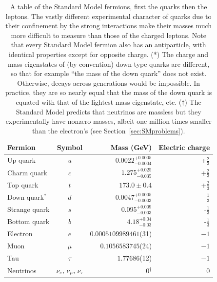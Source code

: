   \renewcommand{\arraystretch}{1.2}
  \begin{table}
    \centering
    \begin{tabular}{l c r r}
      Fermion             & Symbol & Mass (GeV) \cite{pdg} & Electric charge \\
      \hline
      Up quark            & $u$    & $0.0022^{+0.0005}_{-0.0004}$      & +$\frac{2}{3}$  \\
      Charm quark         & $c$    & $1.275^{+0.025}_{-0.035}$       & +$\frac{2}{3}$  \\
      Top quark           & $t$    & $173.0 \pm 0.4$       & +$\frac{2}{3}$  \\
      Down quark$^*$      & $d$    & $0.0047^{+0.0005}_{-0.0003}$      & -$\frac{1}{3}$  \\
      Strange quark       & $s$    & $0.095^{+0.009}_{-0.003}$       & -$\frac{1}{3}$  \\
      Bottom quark        & $b$    & $4.18^{+0.04}_{-0.03}$       & -$\frac{1}{3}$  \\
      \hline
      Electron            & $e$    & $0.0005109989461$(31) & $-1$ \\
      Muon                & $\mu$    & $0.1056583745$(24)  & $-1$ \\
      Tau                 & $\tau$    & $1.77686$(12)  & $-1$ \\
      Neutrinos           & $\nu_{e}$, $\nu_{\mu}$, $\nu_{\tau}$ & 0$^{\dagger}$ & 0 \\
    \end{tabular}
    \caption[Table of Standard Model fermions.]
    {A table of the Standard Model fermions, first the quarks then the leptons.
      The vastly different experimental character of quarks due to their confinement by the strong interactions make their masses much more difficult to measure than those of the charged leptons.
      Note that every Standard Model fermion also has an antiparticle, with identical properties except for opposite charge.
      (*) The charge and mass eigenstates of (by convention) down-type quarks are different, so that for example ``the mass of the down quark'' does not exist. Otherwise, decays across generations would be impossible. In practice, they are so nearly equal that the mass of the down quark is equated with that of the lightest mass eigenstate, etc.
      ($\dagger$) The Standard Model predicts that neutrinos are massless but they experimentally have nonzero masses, albeit one million times smaller than the electron's (see Section~\ref{sec:SMproblems}).
}
            \label{tab:fermions}
  \end{table}
  \renewcommand{\arraystretch}{1}

